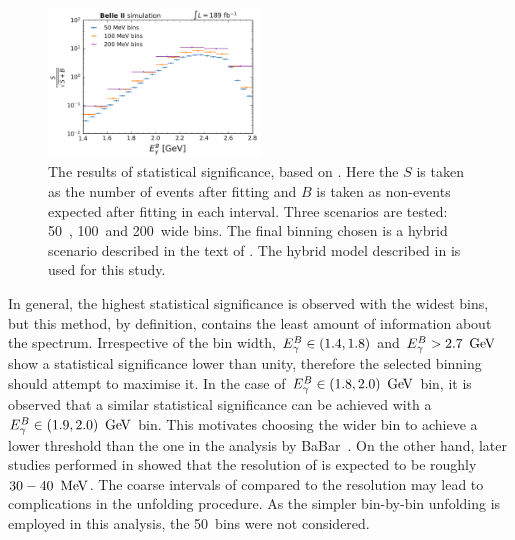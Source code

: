 \begin{figure}[htbp!]
    \centering
    \includegraphics[width=0.5\textwidth]{figures/fitting/binning_significance.pdf}
    \caption{\label{fig:binning_significance}The results of statistical significance, based on .
    Here the $S$ is taken as the number of \BtoXsgamma events after fitting and $B$ is taken as non-\BtoXsgamma events expected after fitting in each \EB interval.
    Three scenarios are tested: 50~\mev, 100~\mev and 200~\mev wide bins.
    The final binning chosen is a hybrid scenario described in the text of .
    The hybrid model described in  is used for this study.
    }    
\end{figure}

In general, the highest statistical significance is observed with the widest bins, but this method, by definition, contains the least amount of information about the spectrum.
Irrespective of the bin width,  ${E^B_{\gamma}}\in(1.4,1.8)$ and ${E^B_{\gamma}}>2.7~\mathrm{\,Ge\kern -0.1em V}$ show a statistical significance lower than unity, therefore the selected binning should attempt to maximise it.
In the case of ${E^B_{\gamma}}\in(1.8,2.0)~\mathrm{\,Ge\kern -0.1em V}$ bin, it is observed that a similar statistical significance can be achieved with a ${E^B_{\gamma}}\in(1.9,2.0)~\mathrm{\,Ge\kern -0.1em V}$ bin.
This motivates choosing the wider bin to achieve a lower threshold than the one in the analysis by BaBar~\cite{BaBar:2007yhb}.
On the other hand, later studies performed in  showed that the resolution of \EB is expected to be roughly $30-40~\mathrm{\,Me\kern -0.1em V}$.
The coarse intervals of \EB compared to the resolution may lead to complications in the unfolding procedure.
As the simpler bin-by-bin unfolding is employed in this analysis, the 50~\mev bins were not considered.

